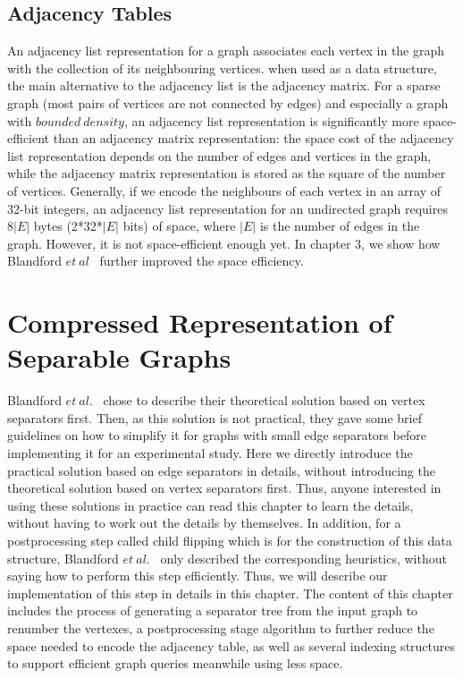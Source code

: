 \documentclass[12pt,glossary]{dalthesis}
\begin{document}
\section{Adjacency Tables}
An adjacency list representation for a graph associates each vertex in the graph with the collection of its neighbouring vertices. when used as a data structure, the main alternative to the adjacency list is the adjacency matrix. For a sparse graph (most pairs of vertices are not connected by edges) and especially a graph with $bounded \ density$, an adjacency list representation is significantly more space-efficient than an adjacency matrix representation: the space cost of the adjacency list representation depends on the number of edges and vertices in the graph, while the adjacency matrix representation is stored as the square of the number of vertices. Generally, if we encode the neighbours of each vertex in an array of 32-bit integers, an adjacency list representation for an undirected graph requires 8$|E|$ bytes (2*32*$|E|$ bits) of space, where $|E|$ is the number of edges in the graph. However, it is not space-efficient enough yet. In chapter 3, we show how Blandford $et \ al$~\cite{compact-representation} further improved the space efficiency.



\chapter{Compressed Representation of Separable Graphs}

Blandford $et \ al.$~\cite{compact-representation} chose to describe their theoretical solution based on vertex separators first. Then, as this solution is not practical, they gave some brief guidelines on how to simplify it for graphs with small edge separators before implementing it for an experimental study. Here we directly introduce the practical solution based on edge separators in details, without introducing the theoretical solution based on vertex separators first. Thus, anyone interested in using these solutions in practice can read this chapter to learn the details, without having to work out the details by themselves. In addition, for a postprocessing step called child flipping which is for the construction of this data structure, Blandford $et \ al.$~\cite{compact-representation} only described the corresponding heuristics, without saying how to perform this step efficiently. Thus, we will describe our implementation of this step in details in this chapter. The content of this chapter includes the process of generating a separator tree from the input graph to renumber the vertexes, a postprocessing stage algorithm to further reduce the space needed to encode the adjacency table, as well as several indexing structures to support efficient graph queries meanwhile using less space.    
\end{document}
